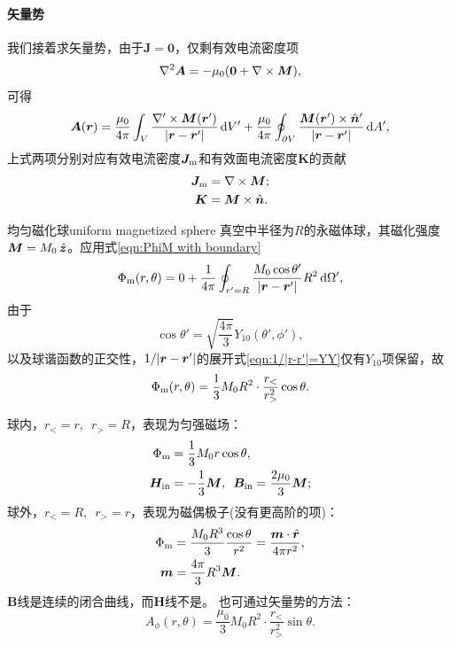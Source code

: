 \paragraph{矢量势}
我们接着求矢量势，由于$\bm J = \bm 0$，仅剩有效电流密度项
\[
    \nabla^2\bm A = -\mu_0(\bm 0 + \nabla\times\bm M),
\]
可得
\begin{equation}
    \label{eqn:A with boundary}
    \bm A(\bm r) = \frac{\mu_0}{4\pi}\int_V\frac{\nabla' \times \bm M(\bm r')}{\lvert\bm r - \bm r'\rvert}\mathop{}\!\mathrm{d} V' + \frac{\mu_0}{4\pi}\oint_{\partial V}\frac{\bm M(\bm r') \times \mathop{}\!\hat{\bm{n}}'}{\lvert\bm r - \bm r'\rvert}\mathop{}\!\mathrm{d} A',
\end{equation}
上式两项分别对应有效电流密度$\bm J_\mathrm m$和有效面电流密度$\bm K$的贡献
\begin{subequations}
    \begin{align}
        \bm J_\mathrm m &= \nabla\times\bm M;\\
        \bm K &= \bm M \times \mathop{}\!\hat{\bm{n}}.
    \end{align}
\end{subequations}
\begin{example}{均匀磁化球}{uniform magnetized sphere}
    真空中半径为$R$的永磁体球，其磁化强度$\bm M = M_0\mathop{}\!\hat{\bm{z}}$。应用式\eqref{eqn:PhiM with boundary}
    \[
        \Phi_\mathrm m(r,\theta) = 0 + \frac1{4\pi}\oint_{r'=R}\frac{M_0\cos\theta'}{\lvert\bm r - \bm r'\rvert}R^2\mathop{}\!\mathrm{d}\Omega',
    \]
    由于
    \[
        \cos\theta' = \sqrt{\frac{4\pi}3}Y_{10}(\theta',\phi'),
    \]
    以及球谐函数的正交性，$1/\lvert\bm r - \bm r'\rvert$的展开式\eqref{eqn:1/|r-r'|=YY}仅有$Y_{10}$项保留，故
    \[
        \Phi_\mathrm m(r,\theta) = \frac13M_0R^2 \cdot \frac{r_<}{r_>^2}\cos\theta.
    \]

    球内，$r_< = r,\enspace r_> = R$，表现为匀强磁场：
    \begin{subequations}
        \label{eq:ed-magnetized-sphere-interior}
        \begin{align}
            \Phi_\mathrm m &= \frac13M_0r\cos\theta,\\
            \bm H_{\mathrm{in}} &= -\frac13\bm M,\enspace\bm B_{\mathrm{in}} = \frac{2\mu_0}3\bm M;
        \end{align}
    \end{subequations}
    球外，$r_< = R,\enspace r_> = r$，表现为磁偶极子(没有更高阶的项)：
    \begin{subequations}
        \label{eq:ed-magnetized-sphere-exterior}
        \begin{align}
            \Phi_\mathrm m &= \frac{M_0R^3}3\frac{\cos\theta}{r^2} = \frac{\bm m \cdot \mathop{}\!\hat{\bm{r}}}{4\pi r^2},\\
            \bm m &= \frac{4\pi}3R^3\bm M.
        \end{align}
    \end{subequations}
    $\bm B$线是连续的闭合曲线，而$\bm H$线不是。
    \tcblower
    也可通过矢量势的方法：
    \[
        A_\phi(r,\theta) = \frac{\mu_0}3M_0R^2 \cdot \frac{r_<}{r_>^2}\sin\theta.
    \]
\end{example}
